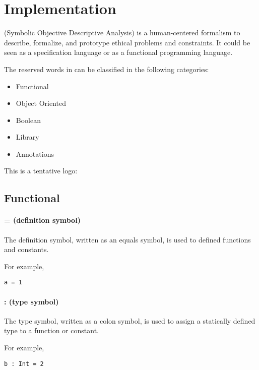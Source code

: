 \chapter{Implementation}

\Soda (Symbolic Objective Descriptive Analysis) is a human-centered formalism to describe, formalize, and prototype ethical problems and constraints.
It could be seen as a specification language or as a functional programming language.

The reserved words in \Soda can be classified in the following categories:

\begin{itemize}
    \item Functional
    \item Object Oriented
    \item Boolean
    \item Library
    \item Annotations
\end{itemize}



This is a tentative logo:

\Sodalogo


\section{Functional}

\subsubsection{= (definition symbol)}

The definition symbol, written as an equals symbol, is used to defined functions and constants.

For example,
\begin{lstlisting}[label={lst:exampleDef}]
  a = 1
\end{lstlisting}

\subsubsection{: (type symbol)}

The type symbol, written as a colon symbol, is used to assign a statically defined type to a function or constant.

For example,
\begin{lstlisting}[label={lst:exampleType01}]
  b : Int = 2
\end{lstlisting}

